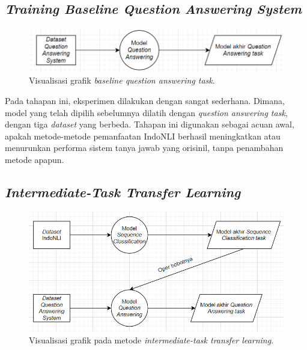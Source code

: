 \subsection{\emph{Training Baseline Question Answering System}}

\begin{figure}[h]
\includegraphics[width=\linewidth]{assets/pics/alur-baseline.png}
\centering
\caption{Visualisasi grafik \emph{baseline question answering task}.}
\end{figure}

Pada tahapan ini, eksperimen dilakukan dengan sangat sederhana. Dimana, model yang telah dipilih sebelumnya dilatih dengan \emph{question answering task}, dengan tiga \emph{dataset} yang berbeda. Tahapan ini digunakan sebagai acuan awal, apakah metode-metode pemanfaatan IndoNLI berhasil meningkatkan atau menurunkan performa sistem tanya jawab yang orisinil, tanpa penambahan metode apapun.

\subsection{\emph{Intermediate-Task Transfer Learning}}

\begin{figure}[h]
\includegraphics[width=\linewidth]{assets/pics/alur1.png}
\centering
\caption{Visualisasi grafik pada metode \emph{intermediate-task transfer learning}.}
\end{figure}

